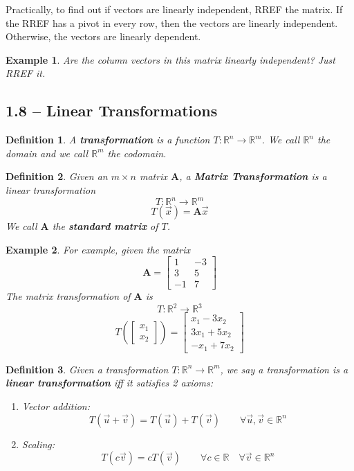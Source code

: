 \documentclass[11pt]{article}
\newtheorem{defn}{Definition}
\newtheorem{ex}{Example}
\begin{document}
Practically, to find out if vectors are linearly independent, RREF the matrix. If the RREF has a pivot in every row, then the vectors are linearly independent. Otherwise, the vectors
are linearly dependent.

\begin{ex}
  Are the column vectors in this matrix linearly independent? Just RREF it.
\end{ex}
\subsection{1.8 -- Linear Transformations}
\begin{defn}
  A \textbf{transformation} is a function $T : \mathbb{R}^{n} \to \mathbb{R}^{m}$. We call $\mathbb{R}^{n}$ the domain
  and we call $\mathbb{R}^{m}$ the codomain.
\end{defn}

\begin{defn}
  Given an $m \times n$ matrix $\mathbf{A}$, a \textbf{Matrix Transformation} is a linear transformation
  \[T: \mathbb{R}^{n} \to \mathbb{R}^{m}\]
  \[T(\vec{x}) = \mathbf{A}\vec{x}\]
  We call $\mathbf{A}$ the \textbf{standard matrix} of $T$.
\end{defn}

\begin{ex}
  For example, given the matrix
  \[\mathbf{A} = \begin{bmatrix} 1 & -3 \\ 3 & 5 \\ -1 & 7 \end{bmatrix}\]
  The matrix transformation of $\mathbf{A}$ is
  \[T : \mathbb{R}^{2} \to \mathbb{R}^{3}\]
  \[T\left(\begin{bmatrix} x_{1} \\ x_{2} \end{bmatrix}\right) = \begin{bmatrix} x_{1} - 3x_{2} \\ 3x_{1} + 5x_{2} \\ -x_{1} + 7x_{2} \end{bmatrix}\]
\end{ex}

\begin{defn}
  Given a transformation $T: \mathbb{R}^{n} \to \mathbb{R}^{m}$,
  we say a transformation is a \textbf{linear transformation} iff it satisfies 2 axioms:
  \begin{enumerate}
    \item Vector addition: \[T(\vec{u} + \vec{v}) = T(\vec{u}) + T(\vec{v}) \qquad \forall \vec{u}, \vec{v} \in \mathbb{R}^{n} \]
    \item Scaling: \[T(c\vec{v}) = c T(\vec{v}) \qquad \forall c \in \mathbb{R} \quad \forall \vec{v} \in \mathbb{R}^{n}\]
  \end{enumerate}
\end{defn}
\end{document}
